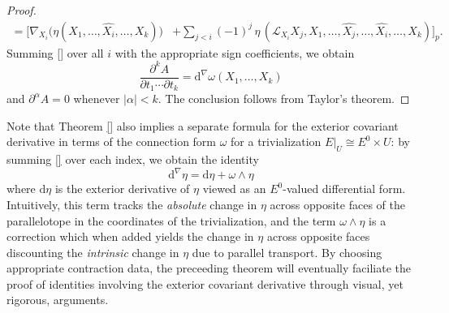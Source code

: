 \begin{proof}
\begin{align}
    = \Bigg[\nabla_{X_i} \Big(\eta(X_1, \ldots, \widehat{X_i}, \ldots, X_k)\Big) &+ \sum_{j < i} (-1)^j  \,\eta\,(\mathcal{L}_{X_i} X_j, X_1, \ldots, \widehat{X_j}, \ldots, \widehat{X_i}, \ldots, X_k)\Bigg]_p.
  \end{align}
  Summing \eqref{} over all $i$ with the appropriate sign coefficients, we obtain
  \begin{equation}
    \frac{\partial^k A}{\partial t_1 \cdots \partial t_k} = \mathrm{d}^\nabla \omega(X_1, \ldots, X_k)
  \end{equation}
  and $\partial^\alpha A = 0$ whenever $|\alpha| < k$. The conclusion follows from Taylor's theorem.
\end{proof}

Note that Theorem \ref{} also implies a separate formula for the exterior covariant derivative in terms of the connection form $\omega$ for a trivialization $E|_U \cong E^0 \times U$: by summing \eqref{} over each index, we obtain the identity
\begin{equation}
  \mathrm{d}^{\!\nabla}\!\eta = \mathrm{d} \eta + \omega \wedge \eta
\end{equation}
where $\mathrm{d}\eta$ is the exterior derivative of $\eta$ viewed as an $E^0$-valued differential form. Intuitively, this term tracks the \emph{absolute} change in $\eta$ across opposite faces of the parallelotope in the coordinates of the trivialization, and the term $\omega \wedge \eta$ is a correction which when added yields the change in $\eta$ across opposite faces discounting the \emph{intrinsic} change in $\eta$ due to parallel transport. By choosing appropriate contraction data, the preceeding theorem will eventually faciliate the proof of identities involving the exterior covariant derivative through visual, yet rigorous, arguments.